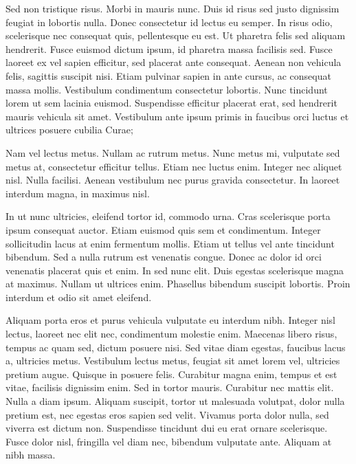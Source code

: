 \documentclass[a4paper,10pt,twoside]{article} %
\begin{document}
Sed non tristique risus.
Morbi in mauris nunc.
Duis id risus sed justo dignissim feugiat in lobortis nulla.
Donec consectetur id lectus eu semper.
In risus odio, scelerisque nec consequat quis, pellentesque eu est.
Ut pharetra felis sed aliquam hendrerit.
Fusce euismod dictum ipsum, id pharetra massa facilisis sed.
Fusce laoreet ex vel sapien efficitur, sed placerat ante consequat.
Aenean non vehicula felis, sagittis suscipit nisi.
Etiam pulvinar sapien in ante cursus, ac consequat massa mollis.
Vestibulum condimentum consectetur lobortis.
Nunc tincidunt lorem ut sem lacinia euismod.
Suspendisse efficitur placerat erat, sed hendrerit mauris vehicula sit amet.
Vestibulum ante ipsum primis in faucibus orci luctus et ultrices posuere cubilia Curae;

Nam vel lectus metus.
Nullam ac rutrum metus.
Nunc metus mi, vulputate sed metus at, consectetur efficitur tellus.
Etiam nec luctus enim.
Integer nec aliquet nisl.
Nulla facilisi.
Aenean vestibulum nec purus gravida consectetur.
In laoreet interdum magna, in maximus nisl.

In ut nunc ultricies, eleifend tortor id, commodo urna.
Cras scelerisque porta ipsum consequat auctor.
Etiam euismod quis sem et condimentum.
Integer sollicitudin lacus at enim fermentum mollis.
Etiam ut tellus vel ante tincidunt bibendum.
Sed a nulla rutrum est venenatis congue.
Donec ac dolor id orci venenatis placerat quis et enim.
In sed nunc elit.
Duis egestas scelerisque magna at maximus.
Nullam ut ultrices enim.
Phasellus bibendum suscipit lobortis.
Proin interdum et odio sit amet eleifend.

Aliquam porta eros et purus vehicula vulputate eu interdum nibh.
Integer nisl lectus, laoreet nec elit nec, condimentum molestie enim.
Maecenas libero risus, tempus ac quam sed, dictum posuere nisi.
Sed vitae diam egestas, faucibus lacus a, ultricies metus.
Vestibulum lectus metus, feugiat sit amet lorem vel, ultricies pretium augue.
Quisque in posuere felis.
Curabitur magna enim, tempus et est vitae, facilisis dignissim enim.
Sed in tortor mauris.
Curabitur nec mattis elit.
Nulla a diam ipsum.
Aliquam suscipit, tortor ut malesuada volutpat, dolor nulla pretium est, nec egestas eros sapien sed velit.
Vivamus porta dolor nulla, sed viverra est dictum non.
Suspendisse tincidunt dui eu erat ornare scelerisque.
Fusce dolor nisl, fringilla vel diam nec, bibendum vulputate ante.
Aliquam at nibh massa.
\end{document}
